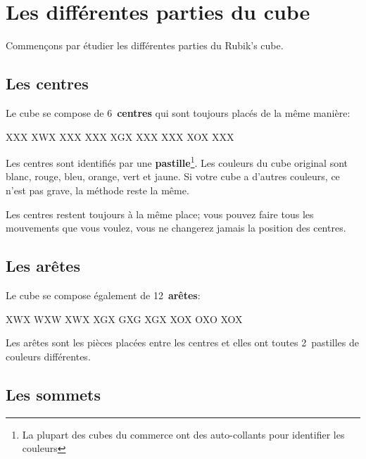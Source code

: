 \chapter{Les différentes parties du cube}

Commençons par étudier les différentes parties du Rubik's cube.

\section{Les centres}

Le cube se compose de 6~\textbf{centres} qui sont toujours placés de la même manière:

\begin{center}
	\RubikFaceUp%
	{X}{X}{X}%
	{X}{W}{X}%
	{X}{X}{X}
	\RubikFaceRight%
	{X}{X}{X}%
	{X}{G}{X}%
	{X}{X}{X}
	\RubikFaceFront%
	{X}{X}{X}%
	{X}{O}{X}%
	{X}{X}{X}
\end{center}

Les centres sont identifiés par une \textbf{pastille}\footnote{La plupart des cubes du commerce ont des auto-collants pour identifier les couleurs}. Les
couleurs du cube original sont blanc, rouge, bleu, orange, vert et
jaune. Si votre cube a d'autres couleurs, ce n'est pas grave, la méthode
reste la même.

Les centres restent toujours à la même place; vous pouvez faire tous les
mouvements que vous voulez, vous ne changerez jamais la position des
centres.

\section{Les arêtes}
\begin{samepage}
Le cube se compose également de 12~\textbf{arêtes}:

\begin{center}
	\RubikFaceUp%
	{X}{W}{X}%
	{W}{X}{W}%
	{X}{W}{X}
	\RubikFaceRight%
	{X}{G}{X}%
	{G}{X}{G}%
	{X}{G}{X}
	\RubikFaceFront%
	{X}{O}{X}%
	{O}{X}{O}%
	{X}{O}{X}
\end{center}
\end{samepage}

Les arêtes sont les pièces placées entre les centres et elles ont toutes
2~pastilles de couleurs différentes.

\section{Les sommets}

